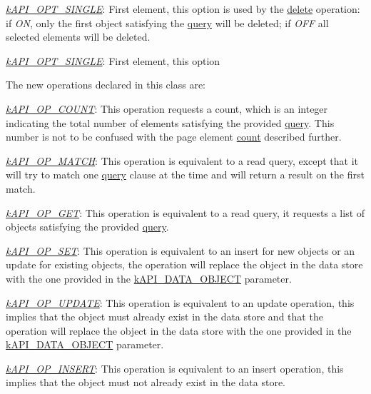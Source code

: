 \begin{DoxyItemize}
\begin{DoxyItemize}
\begin{DoxyItemize}
\item {\itshape \hyperlink{}{k\-A\-P\-I\-\_\-\-O\-P\-T\-\_\-\-S\-I\-N\-G\-L\-E}}\-: First element, this option is used by the \hyperlink{}{delete} operation\-: if {\itshape O\-N}, only the first object satisfying the \hyperlink{}{query} will be deleted; if {\itshape O\-F\-F} all selected elements will be deleted. 
\item {\itshape \hyperlink{}{k\-A\-P\-I\-\_\-\-O\-P\-T\-\_\-\-S\-I\-N\-G\-L\-E}}\-: First element, this option 
\end{DoxyItemize}
\end{DoxyItemize}
\end{DoxyItemize}

The new operations declared in this class are\-:


\begin{DoxyItemize}
\item {\itshape \hyperlink{}{k\-A\-P\-I\-\_\-\-O\-P\-\_\-\-C\-O\-U\-N\-T}}\-: This operation requests a count, which is an integer indicating the total number of elements satisfying the provided \hyperlink{}{query}. This number is not to be confused with the page element \hyperlink{}{count} described further. 
\item {\itshape \hyperlink{}{k\-A\-P\-I\-\_\-\-O\-P\-\_\-\-M\-A\-T\-C\-H}}\-: This operation is equivalent to a read query, except that it will try to match one \hyperlink{}{query} clause at the time and will return a result on the first match. 
\item {\itshape \hyperlink{}{k\-A\-P\-I\-\_\-\-O\-P\-\_\-\-G\-E\-T}}\-: This operation is equivalent to a read query, it requests a list of objects satisfying the provided \hyperlink{}{query}. 
\item {\itshape \hyperlink{}{k\-A\-P\-I\-\_\-\-O\-P\-\_\-\-S\-E\-T}}\-: This operation is equivalent to an insert for new objects or an update for existing objects, the operation will replace the object in the data store with the one provided in the \hyperlink{}{k\-A\-P\-I\-\_\-\-D\-A\-T\-A\-\_\-\-O\-B\-J\-E\-C\-T} parameter. 
\item {\itshape \hyperlink{}{k\-A\-P\-I\-\_\-\-O\-P\-\_\-\-U\-P\-D\-A\-T\-E}}\-: This operation is equivalent to an update operation, this implies that the object must already exist in the data store and that the operation will replace the object in the data store with the one provided in the \hyperlink{}{k\-A\-P\-I\-\_\-\-D\-A\-T\-A\-\_\-\-O\-B\-J\-E\-C\-T} parameter. 
\item {\itshape \hyperlink{}{k\-A\-P\-I\-\_\-\-O\-P\-\_\-\-I\-N\-S\-E\-R\-T}}\-: This operation is equivalent to an insert operation, this implies that the object must not already exist in the data store. 

\end{DoxyItemize}
